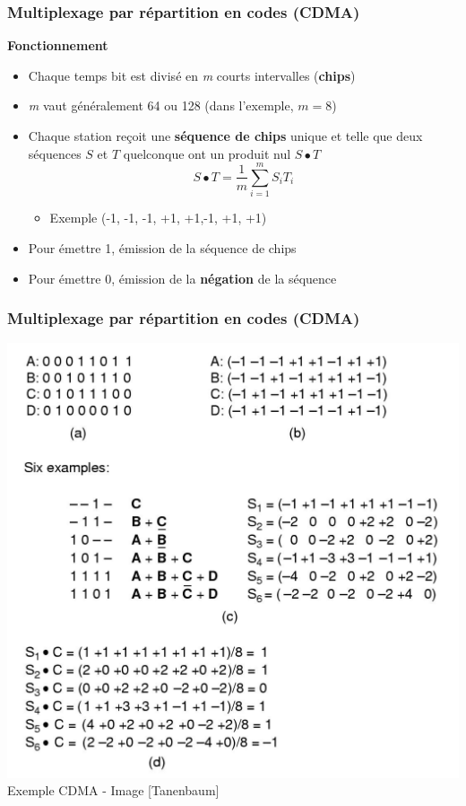 \begin{frame}[fragile]
  \frametitle{Multiplexage par répartition en codes (CDMA)}
\textbf{Fonctionnement}
\begin{itemize}
	\item Chaque temps bit est divisé en \textit{m} courts intervalles
	(\textbf{chips})
	\item \textit{m} vaut généralement 64 ou 128 (dans l'exemple, $m=8$)
	\item Chaque station reçoit une \textbf{séquence de chips} unique et telle
	que deux séquences $S$ et $T$ quelconque ont un produit nul $S\bullet T$
	$$S\bullet T = \frac{1}{m}\sum^m_{i=1}S_iT_i$$
	\begin{itemize}
		\item Exemple (-1, -1, -1, +1, +1,-1, +1, +1)
	\end{itemize}
	\item Pour émettre 1, émission de la séquence de chips
	\item Pour émettre 0, émission de la \textbf{négation} de la séquence
\end{itemize}
\end{frame}

\begin{frame}[fragile]
  \frametitle{Multiplexage par répartition en codes (CDMA)}
\begin{center}
	\item \includegraphics[width=.5\linewidth]{img/4-16.jpg}\\
	{\scriptsize Exemple CDMA - Image [Tanenbaum]}
\end{center}
\end{frame}


